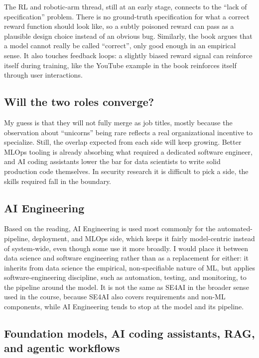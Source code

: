 \documentclass[11pt,a4paper]{article}
\begin{document}
The RL and robotic-arm thread, still at an early stage, connects to the ``lack of specification'' problem. There is no ground-truth specification for what a correct reward function should look like, so a subtly poisoned reward can pass as a plausible design choice instead of an obvious bug. Similarly, the book argues that a model cannot really be called ``correct'', only good enough in an empirical sense. It also touches feedback loops: a slightly biased reward signal can reinforce itself during training, like the YouTube example in the book reinforces itself through user interactions.

\subsection{Will the two roles converge?}

My guess is that they will not fully merge as job titles, mostly because the observation about ``unicorns'' being rare reflects a real organizational incentive to specialize. Still, the overlap expected from each side will keep growing. Better MLOps tooling is already absorbing what required a dedicated software engineer, and AI coding assistants lower the bar for data scientists to write solid production code themselves. In security research it is difficult to pick a side, the skills required fall in the boundary.

\subsection{AI Engineering}

Based on the reading, AI Engineering is used most commonly for the automated-pipeline, deployment, and MLOps side, which keeps it fairly model-centric instead of system-wide, even though some use it more broadly. I would place it between data science and software engineering rather than as a replacement for either: it inherits from data science the empirical, non-specifiable nature of ML, but applies software-engineering discipline, such as automation, testing, and monitoring, to the pipeline around the model. It is not the same as SE4AI in the broader sense used in the course, because SE4AI also covers requirements and non-ML components, while AI Engineering tends to stop at the model and its pipeline.

\subsection{Foundation models, AI coding assistants, RAG, and agentic workflows}
\end{document}
